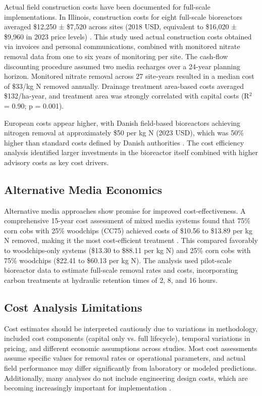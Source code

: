 \documentclass[12pt,a4paper]{article}
\begin{document}
Actual field construction costs have been documented for full-scale implementations. In Illinois, construction costs for eight full-scale bioreactors averaged \$12,250 ± \$7,520 across sites (2018 USD, equivalent to \$16,020 ± \$9,960 in 2023 price levels) \citep{RN289}. This study used actual construction costs obtained via invoices and personal communications, combined with monitored nitrate removal data from one to six years of monitoring per site. The cash-flow discounting procedure assumed two media recharges over a 24-year planning horizon. Monitored nitrate removal across 27 site-years resulted in a median cost of \$33/kg N removed annually. Drainage treatment area-based costs averaged \$132/ha-year, and treatment area was strongly correlated with capital costs (R$^2$ = 0.90; p = 0.001).

European costs appear higher, with Danish field-based bioreactors achieving nitrogen removal at approximately \$50 per kg N (2023 USD), which was 50\% higher than standard costs defined by Danish authorities \citep{RN289}. The cost efficiency analysis identified larger investments in the bioreactor itself combined with higher advisory costs as key cost drivers.

\subsection{Alternative Media Economics}

Alternative media approaches show promise for improved cost-effectiveness. A comprehensive 15-year cost assessment of mixed media systems found that 75\% corn cobs with 25\% woodchips (CC75) achieved costs of \$10.56 to \$13.89 per kg N removed, making it the most cost-efficient treatment \citep{RN350}. This compared favorably to woodchips-only systems (\$13.30 to \$88.11 per kg N) and 25\% corn cobs with 75\% woodchips (\$22.41 to \$60.13 per kg N). The analysis used pilot-scale bioreactor data to estimate full-scale removal rates and costs, incorporating carbon treatments at hydraulic retention times of 2, 8, and 16 hours.

\subsection{Cost Analysis Limitations}

Cost estimates should be interpreted cautiously due to variations in methodology, included cost components (capital only vs. full lifecycle), temporal variations in pricing, and different economic assumptions across studies. Most cost assessments assume specific values for removal rates or operational parameters, and actual field performance may differ significantly from laboratory or modeled predictions. Additionally, many analyses do not include engineering design costs, which are becoming increasingly important for implementation \citep{RN289}.
\end{document}
